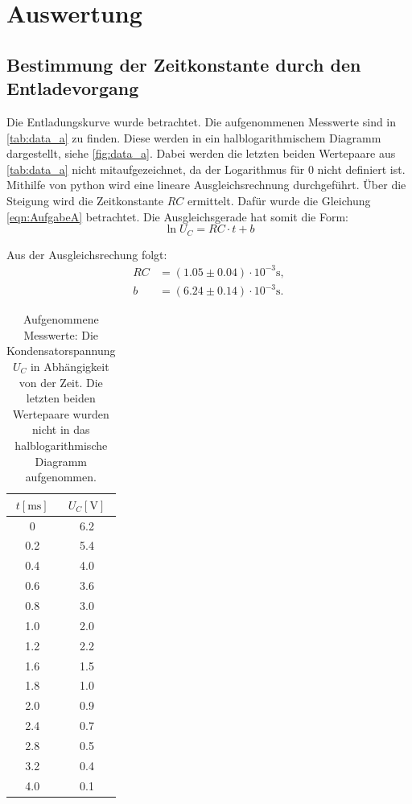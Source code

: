 \section{Auswertung}
\label{sec:Auswertung}

\subsection{Bestimmung der Zeitkonstante durch den Entladevorgang}
\label{subsec:Aufgabe_A}
Die Entladungskurve wurde betrachtet.
Die aufgenommenen Messwerte sind in \autoref{tab:data_a} zu finden.
Diese werden in ein halblogarithmischem Diagramm dargestellt, siehe \autoref{fig:data_a}.
Dabei werden die letzten beiden Wertepaare aus \autoref{tab:data_a} nicht mitaufgezeichnet, da der Logarithmus für 0 nicht definiert ist.
Mithilfe von python wird eine lineare Ausgleichsrechnung durchgeführt.
Über die Steigung wird die Zeitkonstante $RC$ ermittelt.
Dafür wurde die Gleichung \eqref{eqn:AufgabeA} betrachtet.
Die Ausgleichsgerade hat somit die Form:
\begin{equation*}
  \ln U_C = RC \cdot t + b
\end{equation*}

\noindent
Aus der Ausgleichsrechung folgt:
\begin{align*}
  RC &= (1.05 \pm 0.04) \cdot 10^{-3} \si{\second}, \\
  b  &= (6.24 \pm 0.14) \cdot 10^{-3} \si{\second}.
\end{align*}

\begin{table}
  \centering
  \caption{Aufgenommene Messwerte: Die Kondensatorspannung $U_C$ in Abhängigkeit von der Zeit.
  Die letzten beiden Wertepaare wurden nicht in das halblogarithmische Diagramm aufgenommen.}
  \label{tab:data_a}
  \begin{tabular}{c c}
    \toprule
    $t [\si{\milli\second}]$ & $U_C [\si{\volt}]$ \\
    \midrule
      0     &     6.2  \\
      0.2   &     5.4  \\
      0.4   &     4.0  \\
      0.6   &     3.6  \\
      0.8   &     3.0  \\
      1.0   &     2.0  \\
      1.2   &     2.2  \\
      1.6   &     1.5  \\
      1.8   &     1.0  \\
      2.0   &     0.9  \\
      2.4   &     0.7  \\
      2.8   &     0.5  \\
      3.2   &     0.4  \\
      4.0   &     0.1  \\
    \bottomrule
  \end{tabular}
\end{table}

